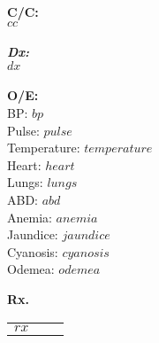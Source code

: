 \documentclass[12pt]{article}
\begin{document}
\setcolumnwidth{2in, 5in}
\vspace*{-0.4cm}
\noindent\textcolor{KUrod}{\makebox[\linewidth]{\rule{\paperwidth}{0.4pt}}}
\vspace*{0.05cm}

\begin{paracol}{2}

    \begin{tcolorbox}[blanker, breakable, width=\linewidth]
    {\fontsize{8}{14}

    \textbf{\large C/C:}
    \\
    $ cc $
    \\ \\
    \textbf{\large\em Dx:}
    \\
    $ dx $
    \\ \\
    \textbf{\large O/E:}
    \\
    BP: $ bp $ \\
	Pulse: $ pulse $\\
	Temperature: $ temperature $\\
	Heart: $ heart $\\
	Lungs: $ lungs $\\
	ABD: $ abd $\\
	Anemia: $ anemia $\\
	Jaundice: $ jaundice $\\
	Cyanosis: $ cyanosis $\\
	Odemea: $ odemea $\\
    }
    \end{tcolorbox}

    \setlength{\columnseprule}{0.4pt}
    \switchcolumn
    \begin{tcolorbox}[blanker, breakable, width=\linewidth]

    {\bf Rx.}
    \\
        \begin{supertabular}[l]{lll}
        \\
        $ rx $
        \end{supertabular}
    \end{tcolorbox}
\end{paracol}
\end{document}
